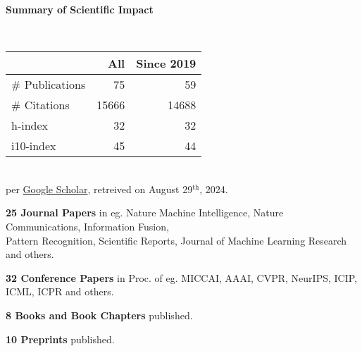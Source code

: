 \headedsection %
{\bf Summary of Scientific Impact}{}{}
{
    \qquad~~~~
    \begin{minipage}[t]{0.6\textwidth}
        \begin{tabular}{lrr}
        \hline
         & All & Since 2019\\
        \hline
        \# Publications & 75     & 59    \\
        \# Citations    & 15666  & 14688 \\
        h-index         & 32     & 32    \\
        i10-index       & 45     & 44    \\
        \hline
    \end{tabular}
    \\
    {\footnotesize{
        per \href{https://scholar.google.com/citations?user=wpLQuroAAAAJ}{Google Scholar},
        retreived on August 29$^\text{th}$, 2024. 
        }
    }
    \end{minipage}

    \ifdefined\shortcv
        \vstep
        {\bf 25 Journal Papers} in eg. Nature Machine Intelligence, Nature Communications, Information Fusion,\\
        \hspace*{\fill} Pattern Recognition, Scientific Reports, Journal of Machine Learning Research and others.

        {\bf 32 Conference Papers} in Proc. of eg. MICCAI, AAAI, CVPR, NeurIPS, ICIP, ICML, ICPR and others.

        {\bf 8 Books and Book Chapters} published.

        {\bf 10 Preprints} published.
        
    \else
        {}
    \fi

}
